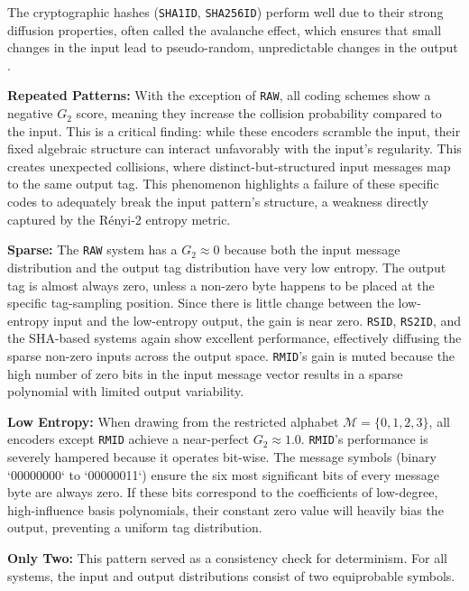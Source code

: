 \documentclass[english,BCOR=4mm,cdfont=false]{tudscrreprt} %
\begin{document}
The cryptographic hashes (\texttt{SHA1ID}, \texttt{SHA256ID}) perform well due to their strong diffusion properties, often called the avalanche effect, which ensures that small changes in the input lead to pseudo-random, unpredictable changes in the output \cite{menezes1996handbook}.

\textbf{Repeated Patterns:} With the exception of \texttt{RAW}, all coding schemes show a negative $G_2$ score, meaning they increase the collision probability compared to the input. This is a critical finding: while these encoders scramble the input, their fixed algebraic structure can interact unfavorably with the input's regularity. This creates unexpected collisions, where distinct-but-structured input messages map to the same output tag. This phenomenon highlights a failure of these specific codes to adequately break the input pattern's structure, a weakness directly captured by the Rényi-2 entropy metric.

\textbf{Sparse:} The \texttt{RAW} system has a $G_2 \approx 0$ because both the input message distribution and the output tag distribution have very low entropy. The output tag is almost always zero, unless a non-zero byte happens to be placed at the specific tag-sampling position. Since there is little change between the low-entropy input and the low-entropy output, the gain is near zero. \texttt{RSID}, \texttt{RS2ID}, and the SHA-based systems again show excellent performance, effectively diffusing the sparse non-zero inputs across the output space. \texttt{RMID}'s gain is muted because the high number of zero bits in the input message vector results in a sparse polynomial with limited output variability.

\textbf{Low Entropy:} When drawing from the restricted alphabet $\mathcal{M}=\{0,1,2,3\}$, all encoders except \texttt{RMID} achieve a near-perfect $G_2 \approx 1.0$. \texttt{RMID}'s performance is severely hampered because it operates bit-wise. The message symbols (binary `00000000` to `00000011`) ensure the six most significant bits of every message byte are always zero. If these bits correspond to the coefficients of low-degree, high-influence basis polynomials, their constant zero value will heavily bias the output, preventing a uniform tag distribution.

\textbf{Only Two:} This pattern served as a consistency check for determinism. For all systems, the input and output distributions consist of two equiprobable symbols.
\end{document}
